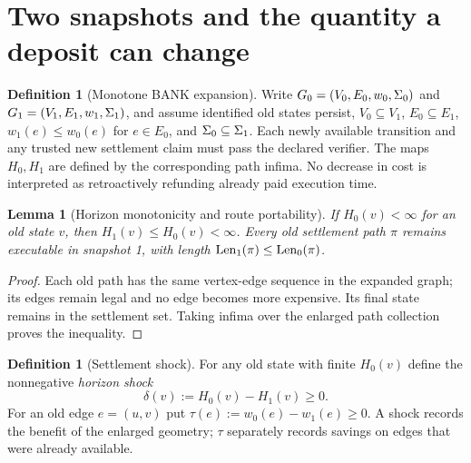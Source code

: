 \documentclass[11pt]{article}
\newtheorem{lemma}[theorem]{Lemma}
\theoremstyle{definition}\newtheorem{definition}[theorem]{Definition}\newtheorem{assumption}[theorem]{Assumption}
\theoremstyle{remark}\newtheorem{remark}[theorem]{Remark}
\begin{document}
\section{Two snapshots and the quantity a deposit can change}
\label{sec:shock}
\begin{definition}[Monotone BANK expansion]\label{def:expansion}
Write $G_0=(V_0,E_0,w_0,\Sigma_0)$ and $G_1=(V_1,E_1,w_1,\Sigma_1)$, and assume identified old states persist, $V_0\subseteq V_1$, $E_0\subseteq E_1$, $w_1(e)\leq w_0(e)$ for $e\in E_0$, and $\Sigma_0\subseteq\Sigma_1$. Each newly available transition and any trusted new settlement claim must pass the declared verifier. The maps $H_0,H_1$ are defined by the corresponding path infima. No decrease in cost is interpreted as retroactively refunding already paid execution time.
\end{definition}
\begin{lemma}[Horizon monotonicity and route portability]\label{lem:mono}
If $H_0(v)<\infty$ for an old state $v$, then $H_1(v)\leq H_0(v)<\infty$. Every old settlement path $\pi$ remains executable in snapshot 1, with length $\operatorname{Len}_1(\pi)\leq\operatorname{Len}_0(\pi)$.
\end{lemma}
\begin{proof}
Each old path has the same vertex-edge sequence in the expanded graph; its edges remain legal and no edge becomes more expensive. Its final state remains in the settlement set. Taking infima over the enlarged path collection proves the inequality.
\end{proof}
\par

\begin{definition}[Settlement shock]\label{def:shock}
For any old state with finite $H_0(v)$ define the nonnegative \emph{horizon shock}
\[
\delta(v):=H_0(v)-H_1(v)\geq0.
\]
For an old edge $e=(u,v)$ put $\tau(e):=w_0(e)-w_1(e)\geq0$. A shock records the benefit of the enlarged geometry; $\tau$ separately records savings on edges that were already available.
\end{definition}
\end{document}
